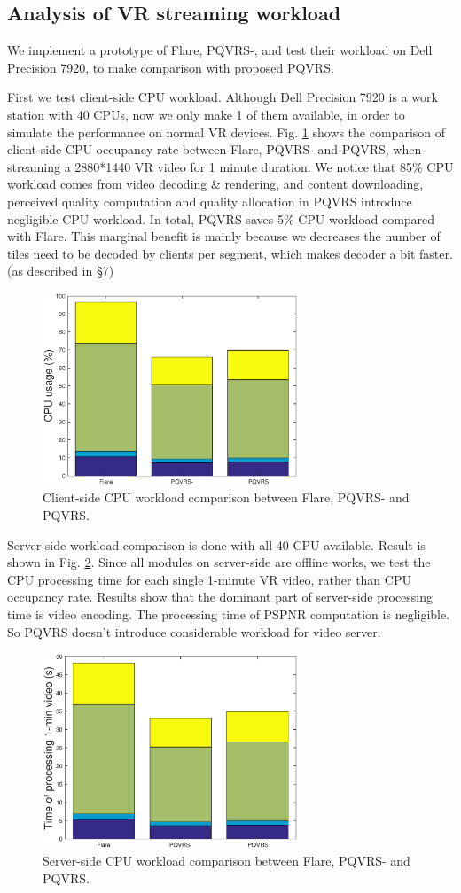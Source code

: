 \subsection{Analysis of VR streaming workload}

We implement a prototype of Flare, PQVRS-, and test their workload on Dell Precision 7920, to make comparison with proposed PQVRS.

First we test client-side CPU workload. Although Dell Precision 7920 is a work station with 40 CPUs, now we only make 1 of them available, in order to simulate the performance on normal VR devices. Fig. \ref{CPUclient} shows the comparison of client-side CPU occupancy rate between Flare, PQVRS- and PQVRS, when streaming a 2880*1440 VR video for 1 minute duration. We notice that 85\% CPU workload comes from video decoding \& rendering, and content downloading, perceived quality computation and quality allocation in PQVRS introduce negligible CPU workload. In total, PQVRS saves 5\% CPU workload compared with Flare. This marginal benefit is mainly because we decreases the number of tiles need to be decoded by clients per segment, which makes decoder a bit faster. (as described in \S 7)

    \begin{figure}
  \centering
  \includegraphics[width=3in]{images/CPUworkload.eps}
  \caption{Client-side CPU workload comparison between Flare, PQVRS- and PQVRS.}
  \label{CPUclient}
  \end{figure}
  
Server-side workload comparison is done with all 40 CPU available. Result is shown in Fig. \ref{CPUserver}. Since all modules on server-side are offline works, we test the CPU processing time for each single 1-minute VR video, rather than CPU occupancy rate. Results show that the dominant part of server-side processing time is video encoding. The processing time of PSPNR computation is negligible. So PQVRS doesn't introduce considerable workload for video server.

    \begin{figure}
  \centering
  \includegraphics[width=3in]{images/Processtime.eps}
  \caption{Server-side CPU workload comparison between Flare, PQVRS- and PQVRS.}
  \label{CPUserver}
  \end{figure}